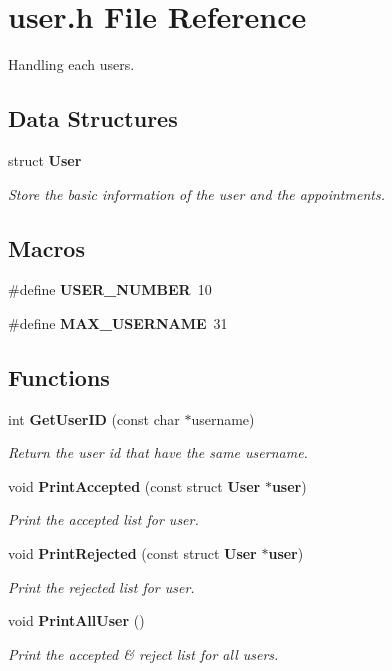 \section{user.\+h File Reference}
\label{user_8h}


Handling each users.  


\subsection*{Data Structures}
\begin{DoxyCompactItemize}
\item 
struct {\bf User}
\begin{DoxyCompactList}\small\item\em Store the basic information of the user and the appointments. \end{DoxyCompactList}\end{DoxyCompactItemize}
\subsection*{Macros}
\begin{DoxyCompactItemize}
\item 
\#define {\bf U\+S\+E\+R\+\_\+\+N\+U\+M\+B\+E\+R}~10
\item 
\#define {\bf M\+A\+X\+\_\+\+U\+S\+E\+R\+N\+A\+M\+E}~31
\end{DoxyCompactItemize}
\subsection*{Functions}
\begin{DoxyCompactItemize}
\item 
int {\bf Get\+User\+I\+D} (const char $\ast$username)
\begin{DoxyCompactList}\small\item\em Return the user id that have the same username. \end{DoxyCompactList}\item 
void {\bf Print\+Accepted} (const struct {\bf User} $\ast${\bf user})\label{user_8h_a1214e8672d5a6d823eb2934cf5a82d0b}

\begin{DoxyCompactList}\small\item\em Print the accepted list for user. \end{DoxyCompactList}\item 
void {\bf Print\+Rejected} (const struct {\bf User} $\ast${\bf user})\label{user_8h_afb40dc85cc1d4b23f9a1a95ef4abc6f5}

\begin{DoxyCompactList}\small\item\em Print the rejected list for user. \end{DoxyCompactList}\item 
void {\bf Print\+All\+User} ()\label{user_8h_a393641d36b97cdf5764c257c9c259734}

\begin{DoxyCompactList}\small\item\em Print the accepted \& reject list for all users. \end{DoxyCompactList}\end{DoxyCompactItemize}

